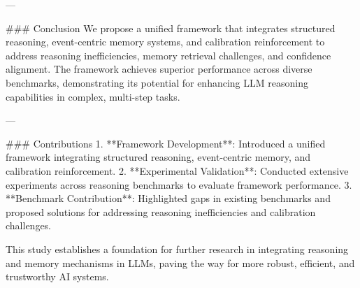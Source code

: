 ---

### Conclusion  
We propose a unified framework that integrates structured reasoning, event-centric memory systems, and calibration reinforcement to address reasoning inefficiencies, memory retrieval challenges, and confidence alignment. The framework achieves superior performance across diverse benchmarks, demonstrating its potential for enhancing LLM reasoning capabilities in complex, multi-step tasks.

---

### Contributions  
1. **Framework Development**: Introduced a unified framework integrating structured reasoning, event-centric memory, and calibration reinforcement.  
2. **Experimental Validation**: Conducted extensive experiments across reasoning benchmarks to evaluate framework performance.  
3. **Benchmark Contribution**: Highlighted gaps in existing benchmarks and proposed solutions for addressing reasoning inefficiencies and calibration challenges.  

This study establishes a foundation for further research in integrating reasoning and memory mechanisms in LLMs, paving the way for more robust, efficient, and trustworthy AI systems.
